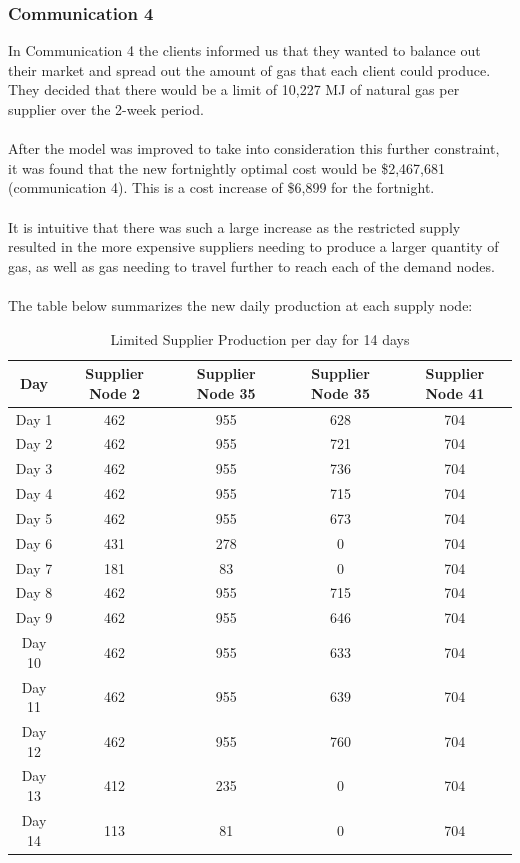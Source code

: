 \documentclass{article}
\begin{document}
\subsubsection{Communication 4}
In Communication 4 the clients informed us that they wanted to balance out their market and spread out the amount of gas that each client could produce. They decided that there would be a limit of 10,227 MJ of natural gas per supplier over the 2-week period. \\
\\
After the model was improved to take into consideration this further constraint, it was found that the new fortnightly optimal cost would be \$2,467,681 (communication 4). This is a cost increase of \$6,899 for the fortnight. \\
\\
It is intuitive that there was such a large increase as the restricted supply resulted in the more expensive suppliers needing to produce a larger quantity of gas, as well as gas needing to travel further to reach each of the demand nodes.\\
\\
The table below summarizes the new daily production at each supply node:
\bigskip
\renewcommand\baselinestretch{1.5}
\begin{table}[h]
    \centering
    \color{black}
    \begin{tabular}{|c:c:c:c:c|}
        \hline
        \textbf{Day} & \textbf{Supplier Node 2} & \textbf{Supplier Node 35} & \textbf{Supplier Node 35} & \textbf{Supplier Node 41} \\ \hline
        Day 1 & 462 & 955 & 628 & 704 \\ \hdashline
        Day 2 & 462 & 955 & 721 & 704 \\ \hdashline
        Day 3 & 462 & 955 & 736 & 704 \\ \hdashline
        Day 4 & 462 & 955 & 715 & 704 \\ \hdashline
        Day 5 & 462 & 955 & 673 & 704 \\ \hdashline
        Day 6 & 431 & 278 & 0 &704 \\ \hdashline
        Day 7 & 181 & 83 & 0 & 704 \\ \hdashline
        Day 8 & 462 & 955 & 715 & 704 \\ \hdashline
        Day 9 & 462 & 955 & 646 & 704 \\ \hdashline
        Day 10 & 462 & 955 & 633 & 704 \\ \hdashline
        Day 11 & 462 & 955 & 639 & 704 \\ \hdashline
        Day 12 & 462 & 955 & 760 & 704 \\ \hdashline
        Day 13 & 412 & 235 & 0 &704 \\ \hdashline
        Day 14 & 113 & 81 & 0 & 704 \\ \hline
    \end{tabular}
    \caption{Limited Supplier Production per day for 14 days}
    \label{tab:supinfoc4}
\end{table}
\renewcommand\baselinestretch{1}
\end{document}
